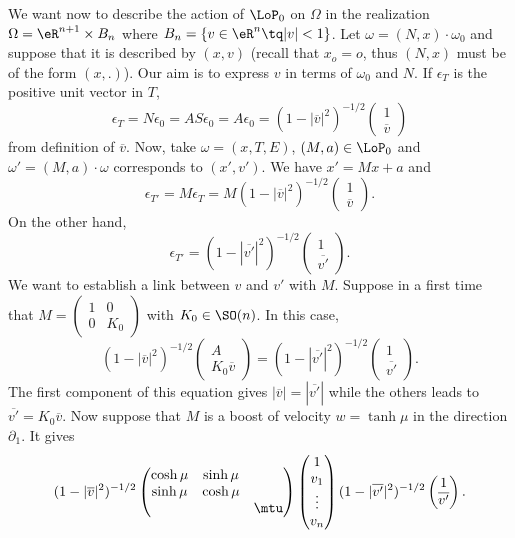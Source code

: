 We want now to describe the action of $\LoP_0$ on $\Omega$ in the realization $\Omega=\eR^{n+1}\times B_n$ where $B_n=\{ v\in\eR^n\tq | v |<1 \}$. Let $\omega=(N,x)\cdot \omega_0$ and suppose that it is described by $(x,v)$ (recall that $x_o=o$, thus $(N,x)$ must be of the form $(x,.)$). Our aim is to express $v$ in terms of $\omega_0$ and $N$. If $\epsilon_T$ is the positive unit vector in $T$,
\begin{equation} \label{eq_epsTv}
  \epsilon_T=N\epsilon_0=AS\epsilon_0=A\epsilon_0=
(1-|\overline{v}|^2)^{-1/2}
\begin{pmatrix}
1\\\overline{v}
\end{pmatrix}
\end{equation}
from definition of $\overline{v}$. Now, take $\omega=(x,T,E)$, $(M,a)\in\LoP_0$ and $\omega'=(M,a)\cdot \omega$ corresponds to $(x',v')$. We have $x'=Mx+a$ and
\[ 
  \epsilon_{T'}=M\epsilon_T=M(1-|\overline{v}|^2)^{-1/2}
\begin{pmatrix}
1\\\overline{v}
\end{pmatrix}.
\]
On the other hand,
\[ 
  \epsilon_{T'}=(1-|\overline{v'}|^2)^{-1/2}
\begin{pmatrix}
1\\\overline{v'}
\end{pmatrix}.
\]
We want to establish a link between $v$ and $v'$ with $M$. Suppose in a first time that 
$
M=
\begin{pmatrix}
1&0\\0&K_0
\end{pmatrix}
$ with $K_0\in \SO(n)$. In this case,
\[ 
  (1-|\overline{v}|^2)^{-1/2}
\begin{pmatrix}
A\\K_0\overline{v}
\end{pmatrix}
=(1-|\overline{v'}|^2)^{-1/2}
\begin{pmatrix}
1\\\overline{v'}
\end{pmatrix}.
\]
The first component of this equation gives $| \overline{v} |=| \overline{v'} |$ while the others leads to $\overline{v'}=K_0\overline{v}$. Now suppose that $M$ is a boost of velocity $w=\tanh\mu$ in the direction $\partial_1$. It gives
\begin{equation} \label{eq_sysumv2}
  (1-|\overline{v}|^2)^{-1/2}
\begin{pmatrix}
  \cosh\mu&\sinh\mu\\
\sinh\mu&\cosh\mu\\
&&\mtu
\end{pmatrix}
\begin{pmatrix}
  1\\v_1\\\vdots\\v_n
\end{pmatrix}
(1-|\overline{v'}|^2)^{-1/2}
\begin{pmatrix}
1\\\overline{v'}
\end{pmatrix}.
\end{equation}

